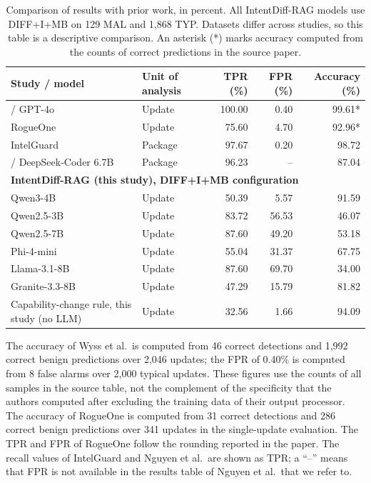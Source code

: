\documentclass[a4paper,fleqn]{cas-dc}
\begin{document}
\begin{table}[t]
\centering\small
\caption{Comparison of results with prior work, in percent.
All IntentDiff-RAG models use DIFF+I+MB on 129 MAL and 1,868 TYP.
Datasets differ across studies, so this table is a descriptive comparison.
An asterisk (*) marks accuracy computed from the counts of correct predictions
in the source paper.}
\label{tab:cross-study}
\begin{tabular}{p{6.5cm} l r r r}
\toprule
Study / model & Unit of analysis & TPR (\%) & FPR (\%) & Accuracy (\%) \\
\midrule
\citet{wyss2025evaluating} / GPT-4o & Update & 100.00 & 0.40 & 99.61* \\
RogueOne \citep{sofaer2024rogueone} & Update & 75.60 & 4.70 & 92.96* \\
IntelGuard \citep{guo2026bridging} & Package & 97.67 & 0.20 & 98.72 \\
\citet{nguyen2025taint} / DeepSeek-Coder 6.7B & Package & 96.23 & -- & 87.04 \\
\midrule
\multicolumn{5}{l}{\textbf{IntentDiff-RAG (this study), DIFF+I+MB configuration}} \\
Qwen3-4B & Update & 50.39 & 5.57 & 91.59 \\
Qwen2.5-3B & Update & 83.72 & 56.53 & 46.07 \\
Qwen2.5-7B & Update & 87.60 & 49.20 & 53.18 \\
Phi-4-mini & Update & 55.04 & 31.37 & 67.75 \\
Llama-3.1-8B & Update & 87.60 & 69.70 & 34.00 \\
Granite-3.3-8B & Update & 47.29 & 15.79 & 81.82 \\
\midrule
Capability-change rule, this study (no LLM) & Update & 32.56 & 1.66 & 94.09 \\
\bottomrule
\end{tabular}
\end{table}

The accuracy of Wyss et al.\ is computed from 46 correct detections and 1,992
correct benign predictions over 2,046 updates; the FPR of 0.40\% is computed from
8 false alarms over 2,000 typical updates. These figures use the counts of all
samples in the source table, not the complement of the specificity that the
authors computed after excluding the training data of their output processor.
The accuracy of RogueOne is computed from 31 correct detections and 286 correct
benign predictions over 341 updates in the single-update evaluation. The TPR and
FPR of RogueOne follow the rounding reported in the paper. The recall values of
IntelGuard and Nguyen et al.\ are shown as TPR; a ``--'' means that FPR is not
available in the results table of Nguyen et al.\ that we refer to.
\end{document}
